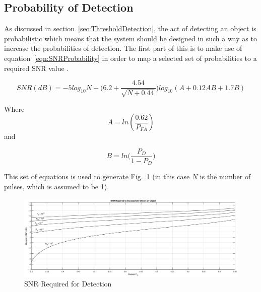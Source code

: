 \documentclass[11pt]{witseiepaper}
\begin{document}
\begin{bibunit}[witseie]
\section{Probability of Detection} \label{sec:SNRProbability}
As discussed in section~\ref{sec:ThresholdDetection}, the act of detecting an object is probabilistic which means that the system should be designed in such a way as to increase the probabilities of detection. 
The first part of this is to make use of equation~\ref{eqn:SNRProbability} in order to map a selected set of probabilities to a required SNR value \cite[p.~107]{radarHandbook}.

\begin{equation} \label{eqn:SNRProbability}
SNR (dB) = -5 log_{10}N + \Bigg(6.2 + \frac{4.54}{\sqrt{N + 0.44}}\Bigg) log_{10}(A + 0.12 A B + 1.7 B)
\end{equation}

Where 
\begin{equation} \label{eqn:A}
A = ln(\frac{0.62}{P_{FA}})
\end{equation}
and 

\begin{equation} \label{eqn:B}
B = ln \Bigg( \frac{P_D}{1 - P_D} \Bigg)
\end{equation}

This set of equations is used to generate Fig.~\ref{fig:SNRRequired} (in this case $N$ is the number of pulses, which is assumed to be 1).

\begin{center}
    \begin{figure}
        \includegraphics[width=\textwidth]{ProbabilityDetection.eps}
        \caption{SNR Required for Detection}
        \label{fig:SNRRequired}    
    \end{figure}
\end{center}


\end{bibunit}
\end{document}
